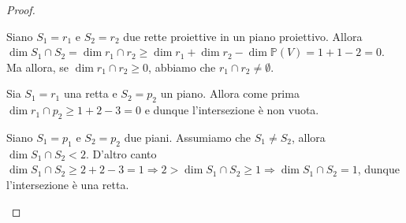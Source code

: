 \begin{proof}
\begin{nlist}
\item Siano $S_1=r_1$ e $S_2=r_2$ due rette proiettive in un piano proiettivo. Allora $\dim S_1 \cap S_2=\dim r_1 \cap r_2 \ge \dim r_1+\dim r_2 -\dim \mathbb{P}(V)=1+1-2=0$. Ma allora, se $\dim r_1 \cap r_2 \ge 0$, abbiamo che $r_1 \cap r_2 \neq \emptyset$.
\item Sia $S_1=r_1$ una retta e $S_2=p_2$ un piano. Allora come prima $\dim r_1 \cap p_2 \ge 1+2-3=0$ e dunque l'intersezione è non vuota.

Siano $S_1=p_1$ e $S_2=p_2$ due piani. Assumiamo che $S_1 \neq S_2$, allora $\dim S_1 \cap S_2 <2$. D'altro canto $\dim S_1 \cap S_2 \ge 2+2-3=1 \Rightarrow 2>\dim S_1\cap S_2 \ge 1 \Rightarrow \dim S_1 \cap S_2=1$, dunque l'intersezione è una retta.
\end{nlist}
\end{proof}

